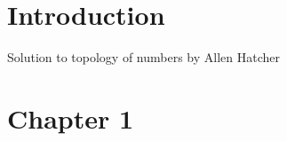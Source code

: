 \documentclass{article}
\begin{document}
\chapter{Introduction}
Solution to topology of numbers by Allen Hatcher
\chapter{Chapter 1}
\end{document}
